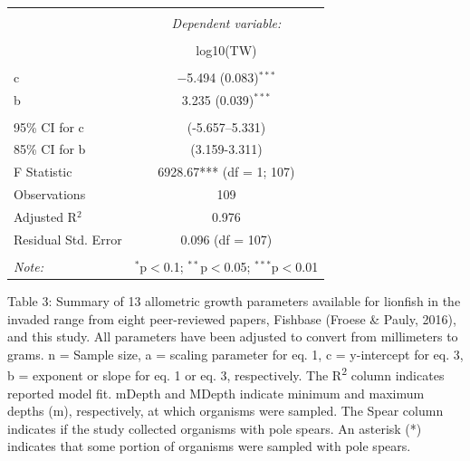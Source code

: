 \documentclass[12pt,]{article}
\begin{document}
\begin{table}[!htbp] \centering 
  \caption{} 
  \label{} 
\begin{tabular}{@{\extracolsep{5pt}}lc} 
\\[-1.8ex]\hline 
\hline \\[-1.8ex] 
 & \multicolumn{1}{c}{\textit{Dependent variable:}} \\ 
\cline{2-2} 
\\[-1.8ex] & log10(TW) \\ 
\hline \\[-1.8ex] 
 c & $-$5.494 (0.083)$^{***}$ \\ 
  b & 3.235 (0.039)$^{***}$ \\ 
 \hline \\[-1.8ex] 
95\% CI for c & (-5.657--5.331) \\ 
85\% CI for b & (3.159-3.311) \\ 
F Statistic & 6928.67*** (df = 1; 107) \\ 
Observations & 109 \\ 
Adjusted R$^{2}$ & 0.976 \\ 
Residual Std. Error & 0.096 (df = 107) \\ 
\hline 
\hline \\[-1.8ex] 
\textit{Note:}  & \multicolumn{1}{r}{$^{*}$p$<$0.1; $^{**}$p$<$0.05; $^{***}$p$<$0.01} \\ 
\end{tabular} 
\end{table}

\clearpage

Table 3: Summary of 13 allometric growth parameters available for
lionfish in the invaded range from eight peer-reviewed papers, Fishbase
(Froese \& Pauly, 2016), and this study. All parameters have been
adjusted to convert from millimeters to grams. n = Sample size, a =
scaling parameter for eq. 1, c = y-intercept for eq. 3, b = exponent or
slope for eq. 1 or eq. 3, respectively. The R\textsuperscript{2} column
indicates reported model fit. mDepth and MDepth indicate minimum and
maximum depths (m), respectively, at which organisms were sampled. The
Spear column indicates if the study collected organisms with pole
spears. An asterisk (*) indicates that some portion of organisms were
sampled with pole spears.
\end{document}
